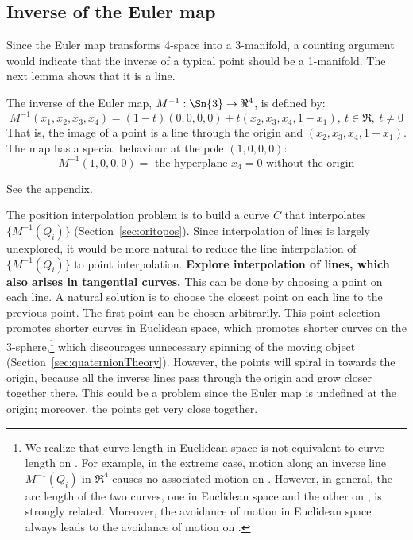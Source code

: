 \documentclass[12pt]{article}
\begin{document}
\subsection{Inverse of the Euler map}
\label{sec:inveuler}

Since the Euler map transforms 4-space into a 3-manifold,
a counting argument would indicate that the inverse of a typical point 
should be a 1-manifold.
The next lemma shows that it is a line.

\begin{lemma}
\label{lem:inverse}
The inverse of the Euler map, $M^{-1}: \Sn{3} \rightarrow \Re^4$, is defined by:
\begin{equation}
\label{eq:eulerinv}
M^{-1}(x_1,x_2,x_3,x_4) = (1-t)(0,0,0,0) + t(x_2,x_3,x_4,1-x_1),\ t \in \Re,\ t \neq 0
\end{equation}
That is, the image of a point is a line through the origin
and $(x_2,x_3,x_4,1-x_1)$.
The map has a special behaviour at the pole $(1,0,0,0)$:
\begin{equation}
\label{eq:eulerpole}
M^{-1}(1,0,0,0) = \mbox{ the hyperplane $x_4=0$ without the origin}
\end{equation}
\end{lemma}
\prf 
See the appendix.
\QED


The position interpolation problem is to build a curve $C$ that
interpolates $\{M^{-1}(Q_i)\}$ (Section~\ref{sec:oritopos}).
Since interpolation of lines is largely unexplored,
it would be more natural to reduce the line interpolation of $\{M^{-1}(Q_i)\}$ 
to point interpolation.
{\bf Explore interpolation of lines, which also arises in tangential curves.}
This can be done by choosing a point on each line.
A natural solution is to choose the closest point on each line to the previous point.
The first point can be chosen arbitrarily. %
This point selection promotes shorter curves in Euclidean space, 
which promotes shorter curves on the 3-sphere,\footnote{We realize that curve length 
        in Euclidean space is not equivalent to curve length on .
        For example, in the extreme case, motion along
	an inverse line $M^{-1}(Q_i)$ in $\Re^4$ causes no associated
	motion on .  However, in general, the arc length
	of the two curves, one in Euclidean space and the other on ,
	is strongly related.
	Moreover, the avoidance of motion in Euclidean space always leads 
	to the avoidance of motion on .}
which discourages unnecessary spinning
of the moving object (Section~\ref{sec:quaternionTheory}). 
However, %
the points
will spiral in towards the origin, because all the inverse lines pass through the origin
and grow closer together there.
This could be a problem since the Euler map is undefined at the origin;
moreover, the points get very close together.
\end{document}
